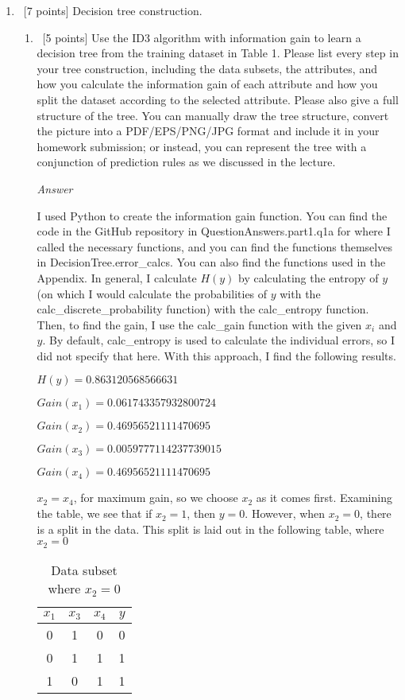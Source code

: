 \documentclass[12pt, fullpage,letterpaper]{article}
\begin{document}
\begin{enumerate}

\item~[7 points] Decision tree construction.

\begin{enumerate}

\item~[5 points] Use the ID3 algorithm with information gain to learn a decision tree from the training dataset in Table 1. Please list every step in your tree construction, including the data subsets, the attributes, and how you calculate the information gain of each attribute and how you split the dataset according to the selected attribute. Please also give a full structure of the tree. You can manually  draw the tree structure,  convert the picture into a PDF/EPS/PNG/JPG format and include it in your homework submission; or instead, you can  represent the tree with a conjunction of prediction rules as we discussed in the lecture. 

\emph{Answer}

I used Python to create the information gain function. You can find the code in the GitHub repository in QuestionAnswers.part1.q1a for where I called the necessary functions, and you can find the functions themselves in DecisionTree.error\_calcs. You can also find the functions used in the Appendix. In general, I calculate $H(y)$ by calculating the entropy of $y$ (on which I would calculate the probabilities of $y$ with the calc\_discrete\_probability function) with the calc\_entropy function. Then, to find the gain, I use the calc\_gain function with the given $x_i$ and $y$. By default, calc\_entropy is used to calculate the individual errors, so I did not specify that here. With this approach, I find the following results.

$H(y)=0.863120568566631$

$Gain(x_1)=0.061743357932800724$

$Gain(x_2)=0.46956521111470695$

$Gain(x_3)=0.0059777114237739015$

$Gain(x_4)=0.46956521111470695$

$x_2=x_4$, for maximum gain, so we choose $x_2$ as it comes first. Examining the table, we see that if $x_2=1$, then $y=0$. However, when $x_2=0$, there is a split in the data. This split is laid out in the following table, where $x_2=0$

\begin{table}[h]
	\centering
	\begin{tabular}{ccc|c}
		$x_1$ & $x_3$ & $x_4$ & $y$\\ 
		\hline\hline
		0 & 1 & 0 & 0 \\ \hline
		0 & 1 & 1 & 1 \\ \hline
		1 & 0 & 1 & 1 \\ \hline
	\end{tabular}
	\caption{Data subset where $x_2=0$}
\end{table}


\end{enumerate}
\end{enumerate}
\end{document}

